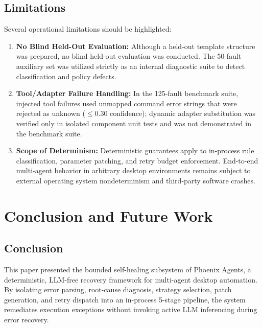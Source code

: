\documentclass[conference]{IEEEtran}
\begin{document}
\subsection{Limitations}
Several operational limitations should be highlighted:
\begin{enumerate}
    \item \textbf{No Blind Held-Out Evaluation:} Although a held-out template structure was prepared, no blind held-out evaluation was conducted. The 50-fault auxiliary set was utilized strictly as an internal diagnostic suite to detect classification and policy defects.
    \item \textbf{Tool/Adapter Failure Handling:} In the 125-fault benchmark suite, injected tool failures used unmapped command error strings that were rejected as unknown ($\le 0.30$ confidence); dynamic adapter substitution was verified only in isolated component unit tests and was not demonstrated in the benchmark suite.
    \item \textbf{Scope of Determinism:} Deterministic guarantees apply to in-process rule classification, parameter patching, and retry budget enforcement. End-to-end multi-agent behavior in arbitrary desktop environments remains subject to external operating system nondeterminism and third-party software crashes.
\end{enumerate}

\section{Conclusion and Future Work}

\subsection{Conclusion}
This paper presented the bounded self-healing subsystem of Phoenix Agents, a deterministic, LLM-free recovery framework for multi-agent desktop automation. By isolating error parsing, root-cause diagnosis, strategy selection, patch generation, and retry dispatch into an in-process 5-stage pipeline, the system remediates execution exceptions without invoking active LLM inferencing during error recovery.
\end{document}
